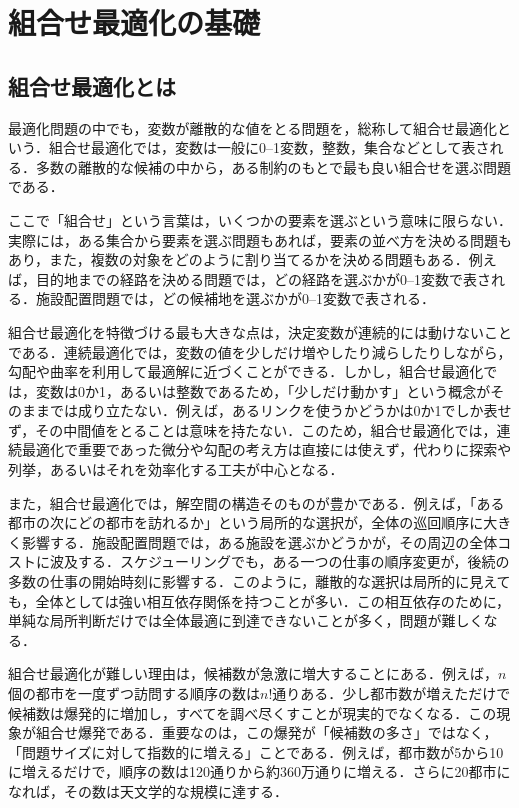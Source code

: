 \section{組合せ最適化の基礎}
\subsection{組合せ最適化とは}

最適化問題の中でも，変数が離散的な値をとる問題を，総称して組合せ最適化という．組合せ最適化では，変数は一般に0--1変数，整数，集合などとして表される．多数の離散的な候補の中から，ある制約のもとで最も良い組合せを選ぶ問題である．

ここで「組合せ」という言葉は，いくつかの要素を選ぶという意味に限らない．実際には，ある集合から要素を選ぶ問題もあれば，要素の並べ方を決める問題もあり，また，複数の対象をどのように割り当てるかを決める問題もある．例えば，目的地までの経路を決める問題では，どの経路を選ぶかが0--1変数で表される．施設配置問題では，どの候補地を選ぶかが0--1変数で表される．

組合せ最適化を特徴づける最も大きな点は，決定変数が連続的には動けないことである．連続最適化では，変数の値を少しだけ増やしたり減らしたりしながら，勾配や曲率を利用して最適解に近づくことができる．しかし，組合せ最適化では，変数は0か1，あるいは整数であるため，「少しだけ動かす」という概念がそのままでは成り立たない．例えば，あるリンクを使うかどうかは0か1でしか表せず，その中間値をとることは意味を持たない．このため，組合せ最適化では，連続最適化で重要であった微分や勾配の考え方は直接には使えず，代わりに探索や列挙，あるいはそれを効率化する工夫が中心となる．

また，組合せ最適化では，解空間の構造そのものが豊かである．例えば，「ある都市の次にどの都市を訪れるか」という局所的な選択が，全体の巡回順序に大きく影響する．施設配置問題では，ある施設を選ぶかどうかが，その周辺の全体コストに波及する．スケジューリングでも，ある一つの仕事の順序変更が，後続の多数の仕事の開始時刻に影響する．このように，離散的な選択は局所的に見えても，全体としては強い相互依存関係を持つことが多い．この相互依存のために，単純な局所判断だけでは全体最適に到達できないことが多く，問題が難しくなる．

組合せ最適化が難しい理由は，候補数が急激に増大することにある．例えば，$n$個の都市を一度ずつ訪問する順序の数は$n!$通りある．少し都市数が増えただけで候補数は爆発的に増加し，すべてを調べ尽くすことが現実的でなくなる．この現象が組合せ爆発である．重要なのは，この爆発が「候補数の多さ」ではなく，「問題サイズに対して指数的に増える」ことである．例えば，都市数が5から10に増えるだけで，順序の数は120通りから約360万通りに増える．さらに20都市になれば，その数は天文学的な規模に達する．

